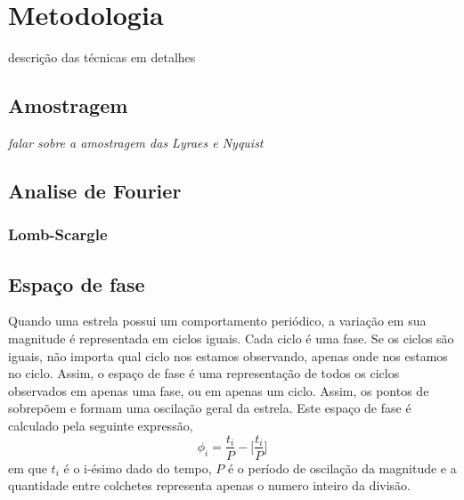 \chapter{Metodologia}

descrição das técnicas em detalhes

\section{Amostragem}

\textit{falar sobre a amostragem das Lyraes e Nyquist}

\section{Analise de Fourier}

\subsection{Lomb-Scargle}

\section{Espaço de fase}

Quando uma estrela possui um comportamento periódico, a variação em sua magnitude é representada em ciclos iguais. Cada ciclo é uma fase. Se os ciclos são iguais, não importa qual ciclo nos estamos observando, apenas onde nos estamos no ciclo. Assim, o espaço de fase é uma representação de todos os ciclos observados em apenas uma fase, ou em apenas um ciclo. Assim, os pontos de sobrepõem e formam uma oscilação geral da estrela. Este espaço de fase é calculado pela seguinte expressão,
\begin{equation}
\phi_i = \frac{t_i}{P} - \Big[\frac{t_i}{P}\Big]
\end{equation}
em que $t_i$ é o i-ésimo dado do tempo, $P$ é o período de oscilação da magnitude e a quantidade entre colchetes representa apenas o numero inteiro da divisão. 




